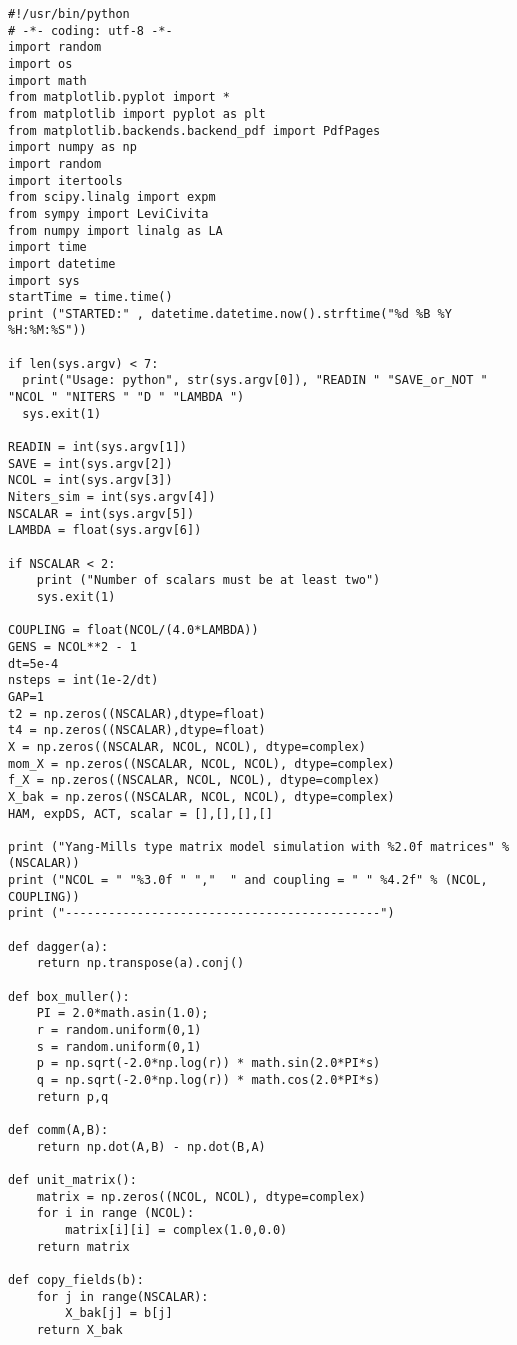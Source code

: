 \begin{lstlisting}
#!/usr/bin/python
# -*- coding: utf-8 -*-
import random
import os
import math
from matplotlib.pyplot import *
from matplotlib import pyplot as plt
from matplotlib.backends.backend_pdf import PdfPages
import numpy as np
import random
import itertools 
from scipy.linalg import expm
from sympy import LeviCivita
from numpy import linalg as LA
import time 
import datetime 
import sys
startTime = time.time()
print ("STARTED:" , datetime.datetime.now().strftime("%d %B %Y %H:%M:%S"))

if len(sys.argv) < 7:
  print("Usage: python", str(sys.argv[0]), "READIN " "SAVE_or_NOT " "NCOL " "NITERS " "D " "LAMBDA ")
  sys.exit(1)

READIN = int(sys.argv[1])
SAVE = int(sys.argv[2])
NCOL = int(sys.argv[3]) 
Niters_sim = int(sys.argv[4]) 
NSCALAR = int(sys.argv[5])
LAMBDA = float(sys.argv[6])

if NSCALAR < 2:
    print ("Number of scalars must be at least two")
    sys.exit(1) 

COUPLING = float(NCOL/(4.0*LAMBDA))
GENS = NCOL**2 - 1
dt=5e-4
nsteps = int(1e-2/dt)
GAP=1
t2 = np.zeros((NSCALAR),dtype=float)
t4 = np.zeros((NSCALAR),dtype=float)
X = np.zeros((NSCALAR, NCOL, NCOL), dtype=complex)
mom_X = np.zeros((NSCALAR, NCOL, NCOL), dtype=complex)
f_X = np.zeros((NSCALAR, NCOL, NCOL), dtype=complex)
X_bak = np.zeros((NSCALAR, NCOL, NCOL), dtype=complex)
HAM, expDS, ACT, scalar = [],[],[],[]

print ("Yang-Mills type matrix model simulation with %2.0f matrices" % (NSCALAR)) 
print ("NCOL = " "%3.0f " ","  " and coupling = " " %4.2f" % (NCOL, COUPLING)) 
print ("--------------------------------------------")

def dagger(a):
    return np.transpose(a).conj()

def box_muller():
    PI = 2.0*math.asin(1.0);    
    r = random.uniform(0,1)
    s = random.uniform(0,1)
    p = np.sqrt(-2.0*np.log(r)) * math.sin(2.0*PI*s)
    q = np.sqrt(-2.0*np.log(r)) * math.cos(2.0*PI*s)
    return p,q

def comm(A,B):
    return np.dot(A,B) - np.dot(B,A)

def unit_matrix():
    matrix = np.zeros((NCOL, NCOL), dtype=complex)
    for i in range (NCOL):
        matrix[i][i] = complex(1.0,0.0)
    return matrix

def copy_fields(b):
    for j in range(NSCALAR):
        X_bak[j] = b[j]
    return X_bak


\end{lstlisting}
